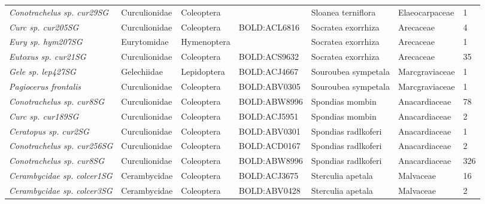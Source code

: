 \documentclass[11pt]{article}
\begin{document}
\begin{landscape}
\begin{longtable}{@{}lllllll@{}}
\textit{Conotrachelus sp. cur29SG}                    & Curculionidae   & Coleoptera   &              & Sloanea terniflora                 & Elaeocarpaceae   & 1     \\
\textit{Curc sp. cur205SG}                            & Curculionidae   & Coleoptera   & BOLD:ACL6816 & Socratea exorrhiza                 & Arecaceae        & 4     \\
\textit{Eury sp. hym207SG}                            & Eurytomidae     & Hymenoptera  &              & Socratea exorrhiza                 & Arecaceae        & 1     \\
\textit{Eutoxus sp. cur21SG}                          & Curculionidae   & Coleoptera   & BOLD:ACS9632 & Socratea exorrhiza                 & Arecaceae        & 35    \\
\textit{Gele sp. lep427SG}                            & Gelechiidae     & Lepidoptera  & BOLD:ACJ4667 & Souroubea sympetala                & Marcgraviaceae   & 1     \\
\textit{Pagiocerus frontalis}                         & Curculionidae   & Coleoptera   & BOLD:ABV0305 & Souroubea sympetala                & Marcgraviaceae   & 1     \\
\textit{Conotrachelus sp. cur8SG}                     & Curculionidae   & Coleoptera   & BOLD:ABW8996 & Spondias mombin                    & Anacardiaceae    & 78    \\
\textit{Curc sp. cur189SG}                            & Curculionidae   & Coleoptera   & BOLD:ACJ5951 & Spondias mombin                    & Anacardiaceae    & 2     \\
\textit{Ceratopus sp. cur2SG}                         & Curculionidae   & Coleoptera   & BOLD:ABV0301 & Spondias radlkoferi                & Anacardiaceae    & 1     \\
\textit{Conotrachelus sp. cur256SG}                   & Curculionidae   & Coleoptera   & BOLD:ACD0167 & Spondias radlkoferi                & Anacardiaceae    & 2     \\
\textit{Conotrachelus sp. cur8SG}                     & Curculionidae   & Coleoptera   & BOLD:ABW8996 & Spondias radlkoferi                & Anacardiaceae    & 326   \\
\textit{Cerambycidae sp. colcer1SG}                   & Cerambycidae    & Coleoptera   & BOLD:ACJ3675 & Sterculia apetala                  & Malvaceae        & 16    \\
\textit{Cerambycidae sp. colcer3SG}                   & Cerambycidae    & Coleoptera   & BOLD:ABV0428 & Sterculia apetala                  & Malvaceae        & 2     \\

\end{longtable}
\end{landscape}
\end{document}
